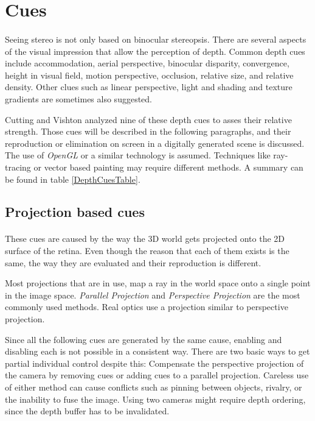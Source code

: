\section{Cues\label{Cues}}
\paragraph{}
Seeing stereo is not only based on binocular stereopsis.
There are several aspects of the visual impression that allow the perception of depth.
Common depth cues include accommodation, aerial perspective, binocular disparity, convergence, height in visual field, motion perspective, occlusion, relative size, and relative density.
Other clues such as linear perspective, light and shading and texture gradients are sometimes also suggested.

Cutting and Vishton\cite{DepthCues} analyzed nine of these depth cues to asses their relative strength.
Those cues will be described in the following paragraphs, and their reproduction or elimination on screen in a digitally generated scene is discussed.
The use of \textit{OpenGL} or a similar technology is assumed.
Techniques like ray-tracing or vector based painting may require different methods.
A summary can be found in table \ref{DepthCuesTable}.


\subsection{Projection based cues}
\paragraph{}
These cues are caused by the way the 3D world gets projected onto the 2D surface of the retina.
Even though the reason that each of them exists is the same, the way they are evaluated and their reproduction is different.

Most projections\cite{proj} that are in use, map a ray in the world space onto a single point in the image space. \textit{Parallel Projection}\cite{parallel} and \textit{Perspective Projection}\cite{perspective} are the most commonly used methods. Real optics use a projection similar to perspective projection.

Since all the following cues are generated by the same cause, enabling and disabling each is not possible in a consistent way.
There are two basic ways to get partial individual control despite this:
Compensate  the perspective projection of the camera by removing cues or  adding cues to a parallel projection.
Careless use of either method can cause conflicts such as pinning between objects, rivalry, or the inability to fuse the image.
Using two cameras might require depth ordering, since the depth buffer has to be invalidated.


